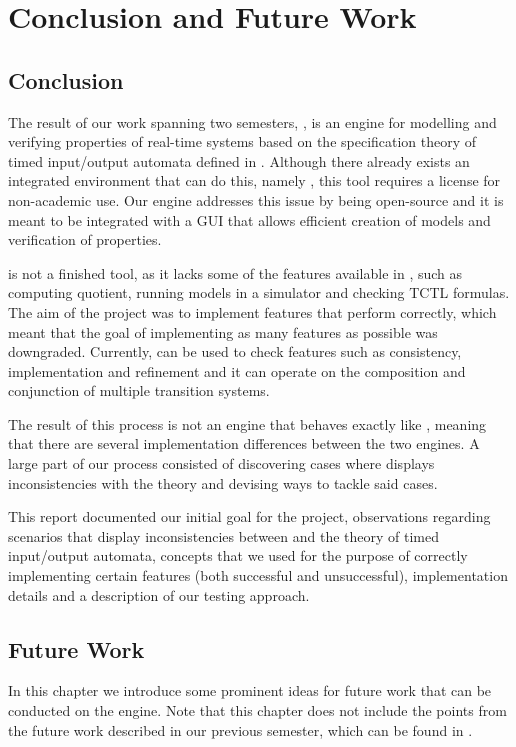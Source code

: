 \chapter{Conclusion and Future Work}

\section{Conclusion}\label{sec:conclusion}
The result of our work spanning two semesters, \jecdar, is an engine for modelling and verifying properties of real-time systems based on the specification theory of timed input/output automata defined in \textcite{David:2010}. Although there already exists an integrated environment that can do this, namely \ecdar, this tool requires a license for non-academic use. Our engine addresses this issue by being open-source and it is meant to be integrated with a GUI that allows efficient creation of models and verification of properties.

\jecdar is not a finished tool, as it lacks some of the features available in \ecdar, such as computing quotient, running models in a simulator and checking TCTL formulas. The aim of the project was to implement features that perform correctly, which meant that the goal of implementing as many features as possible was downgraded. Currently, \jecdar can be used to check features such as consistency, implementation and refinement and it can operate on the composition and conjunction of multiple transition systems.

The result of this process is not an engine that behaves exactly like \ecdar, meaning that there are several implementation differences between the two engines. A large part of our process consisted of discovering cases where \ecdar displays inconsistencies with the theory and devising ways to tackle said cases.

This report documented our initial goal for the project, observations regarding scenarios that display inconsistencies between \ecdar and the theory of timed input/output automata, concepts that we used for the purpose of correctly implementing certain features (both successful and unsuccessful), implementation details and a description of our testing approach.

\section{Future Work}\label{sec:future}
In this chapter we introduce some prominent ideas for future work that can be conducted on the \jecdar engine. Note that this chapter does not include the points from the future work described in our previous semester, which can be found in \textcite{Jecdar:2019}.

